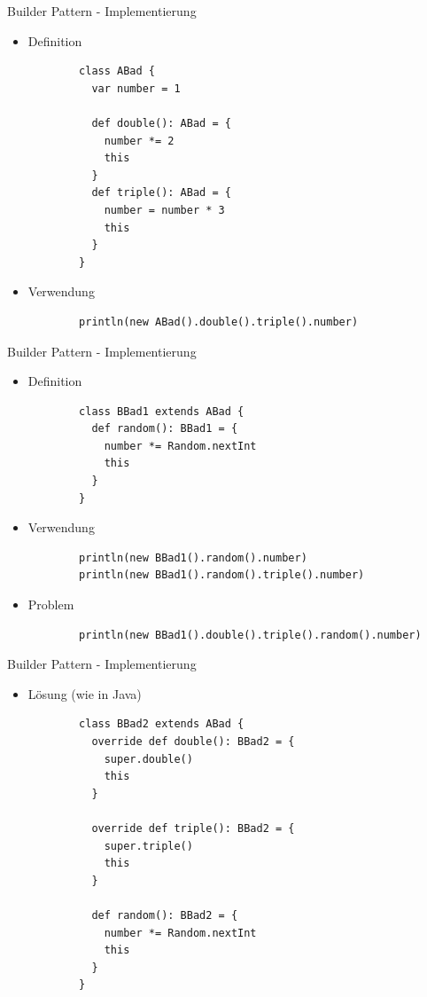 \documentclass{beamer}
\begin{document}

\begin{frame}[fragile]{Builder Pattern - Implementierung}
\begin{itemize}
	\item Definition
		\begin{lstlisting}
		class ABad {
		  var number = 1
  
		  def double(): ABad = {
		    number *= 2
		    this
		  }
		  def triple(): ABad = {
		    number = number * 3
		    this
		  }
		}
		\end{lstlisting}
	\item Verwendung
		\begin{lstlisting}
		println(new ABad().double().triple().number)
		\end{lstlisting}
\end{itemize}
\end{frame}


\begin{frame}[fragile]{Builder Pattern - Implementierung}
\begin{itemize}
	\item Definition
		\begin{lstlisting}
		class BBad1 extends ABad {
		  def random(): BBad1 = {
		    number *= Random.nextInt
		    this
		  }
		}
		\end{lstlisting}
	\item Verwendung
		\begin{lstlisting}
		println(new BBad1().random().number)
		println(new BBad1().random().triple().number)
		\end{lstlisting}
	\item Problem
		\begin{lstlisting}
		println(new BBad1().double().triple().random().number)
		\end{lstlisting}
\end{itemize}
\end{frame}


\begin{frame}[fragile]{Builder Pattern - Implementierung}
\begin{itemize}
	\item Lösung (wie in Java)
		\begin{lstlisting}
		class BBad2 extends ABad {
		  override def double(): BBad2 = {
		    super.double()
		    this
		  }

		  override def triple(): BBad2 = {
		    super.triple()
		    this
		  }

		  def random(): BBad2 = {
		    number *= Random.nextInt
		    this
		  }
		}
		\end{lstlisting}
\end{itemize}
\end{frame}
\end{document}
